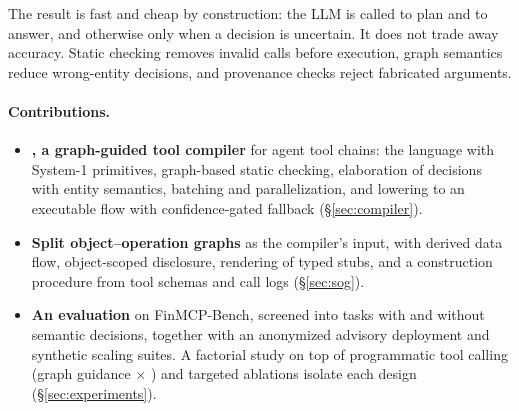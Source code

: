 The result is fast and cheap by construction: the LLM is called to plan and to answer, and otherwise only when a decision is uncertain. It does not trade away accuracy. Static checking removes invalid calls before execution, graph semantics reduce wrong-entity decisions, and provenance checks reject fabricated arguments.

\paragraph{Contributions.}
\begin{itemize}
  \item \textbf{\jif, a graph-guided tool compiler} for agent tool chains: the \pyif language with System-1 primitives, graph-based static checking, elaboration of decisions with entity semantics, batching and parallelization, and lowering to an executable flow with confidence-gated fallback (\S\ref{sec:compiler}).
  \item \textbf{Split object--operation graphs} as the compiler's input, with derived data flow, object-scoped disclosure, rendering of typed stubs, and a construction procedure from tool schemas and call logs (\S\ref{sec:sog}).
  \item \textbf{An evaluation} on FinMCP-Bench, screened into tasks with and without semantic decisions, together with an anonymized advisory deployment and synthetic scaling suites. A factorial study on top of programmatic tool calling (graph guidance $\times$ \jif) and targeted ablations isolate each design (\S\ref{sec:experiments}). 
\end{itemize}
